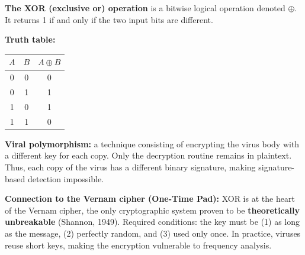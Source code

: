 \documentclass[a4paper,11pt]{article}
\theoremstyle{plain}
\theoremstyle{definition}
\begin{document}
\begin{rappel}
\textbf{The XOR (exclusive or) operation} is a bitwise logical operation denoted $\oplus$. It returns 1 if and only if the two input bits are different.

\medskip
\textbf{Truth table:}

\begin{center}
\begin{tabular}{cc|c}
\toprule
$A$ & $B$ & $A \oplus B$ \\
\midrule
0 & 0 & 0 \\
0 & 1 & 1 \\
1 & 0 & 1 \\
1 & 1 & 0 \\
\bottomrule
\end{tabular}
\end{center}

\medskip
\textbf{Viral polymorphism:} a technique consisting of encrypting the virus body with a different key for each copy. Only the decryption routine remains in plaintext. Thus, each copy of the virus has a different binary signature, making signature-based detection impossible.

\medskip
\textbf{Connection to the Vernam cipher (One-Time Pad):} XOR is at the heart of the Vernam cipher, the only cryptographic system proven to be \textbf{theoretically unbreakable} (Shannon, 1949). Required conditions: the key must be (1) as long as the message, (2) perfectly random, and (3) used only once. In practice, viruses reuse short keys, making the encryption vulnerable to frequency analysis.
\end{rappel}
\end{document}
